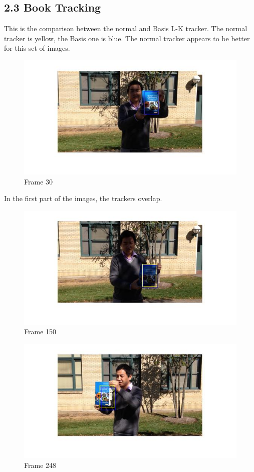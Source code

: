 \documentclass[11pt]{article}
\begin{document}
\subsection*{2.3 Book Tracking}
This is the comparison between the normal and Basis L-K tracker. The normal tracker is yellow, the Basis one is blue. The normal tracker appears to be better for this set of images. 
\begin{figure}[H]
\centering
\includegraphics[width=150mm]{bookFrame30.jpg}
\caption{Frame 30}
\end{figure}
In the first part of the images, the trackers overlap. 
\\
\begin{figure}[H]
\centering
\includegraphics[width=150mm]{bookFrame150.jpg}
\caption{Frame 150}
\end{figure}
\begin{figure}[H]
\centering
\includegraphics[width=150mm]{bookFrame248.jpg}
\caption{Frame 248}
\end{figure}
\end{document}
